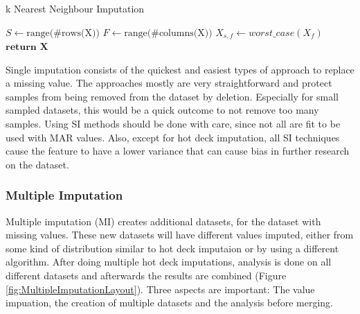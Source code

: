 \documentclass[10pt,a4paper]{article}
\begin{document}
\begin{itemize}
		\begin{algorithm}[H]
			\caption{k Nearest Neighbour Imputation}\label{alg:WorstCaseImputation}
			\begin{algorithmic}[1]
				\State $S \gets \text{range(\#rows(X))}$ 	
				\State $F \gets \text{range(\#columns(X))}$ 	
				 					
				 				 			
				\State $X_{s,f} \gets \textit{worst\_case}(X_f)$	
				\EndIf
				\EndFor
				\State $\textbf{return X}$
				\EndProcedure
			\end{algorithmic}
		\end{algorithm}
		
	\end{itemize}

	Single imputation consists of the quickest and easiest types of approach to replace a missing value. The approaches mostly are very straightforward and protect samples from being removed from the dataset by deletion\cite{haukoos2007advanced, cartwright2003dealing}. Especially for small sampled datasets, this would be a quick outcome to not remove too many samples. Using SI methods should be done with care, since not all are fit to be used with MAR values. Also, except for hot deck imputation, all SI techniques cause the feature to have a lower variance that can cause bias in further research on the dataset\cite{donders2006gentle}. 
	
	\subsubsection{Multiple Imputation}
	\label{subsec:MultipleImputation}
	
	Multiple imputation (MI) creates additional datasets, for the dataset with missing values. These new datasets will have different values imputed, either from some kind of distribution similar to hot deck imputaion or by using a different algorithm. After doing multiple hot deck imputations, analysis is done on all different datasets and afterwards the results are combined (Figure \ref{fig:MultipleImputationLayout}). Three aspects are important: The value impuation, the creation of multiple datasets and the analysis before merging.
		
\end{document}
